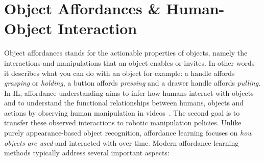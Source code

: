 \section{Object Affordances \& Human-Object Interaction}
Object affordances stands for the actionable properties of objects, namely the interactions and manipulations that an object enables or invites. In other words it describes what you can do with an object for example:
a handle affords \textit{grasping} or \textit{holding}, a button affords \textit{pressing} and a drawer handle affords 
\textit{pulling}.
In \ac{IL}, affordance understanding aims to infer how humans interact with objects and to understand the functional relationships between humans, objects and actions by observing human manipulation in videos~\cite{Eze2024LearningBW}. The second goal is to transfer these observed interactions to robotic manipulation policies. Unlike purely appearance-based object recognition, affordance learning focuses on \textit{how objects are used} and interacted with over time.
Modern affordance learning methods typically address several important aspects:
